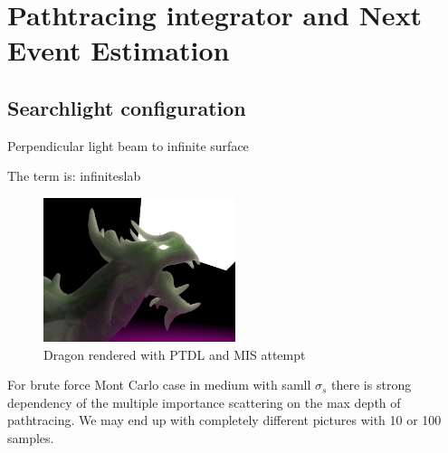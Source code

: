 \chapter{Pathtracing integrator and Next Event Estimation}
\label{chapter:ptdl}


\section{Searchlight configuration}
Perpendicular light beam to infinite surface \cite{Jacques1995}

The term is: \gls{infiniteslab}

\begin{figure}[h]
    \centering
    \includegraphics[width=0.5\textwidth]{"imgs/renders/dragon_ptdl"}
    \caption{Dragon rendered with PTDL and MIS attempt}
    \label{fig:dragon_ptdl}
\end{figure}


For brute force Mont Carlo case in medium with samll $\sigma_s$ there is strong
dependency of the multiple importance scattering on the max depth of
pathtracing. We may end up with completely different pictures with 10 or 100
samples.
